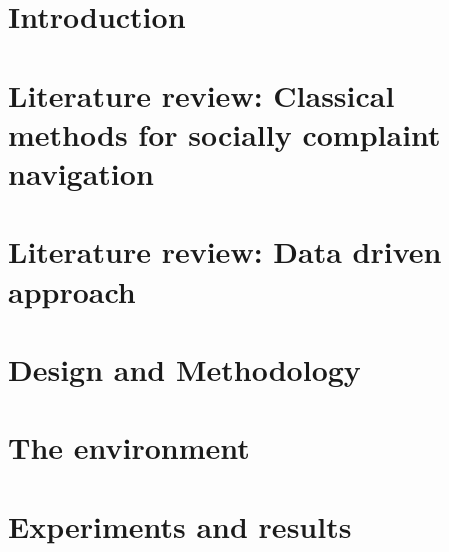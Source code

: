 \documentclass[letter,12pt,TexShade,oneside]{book}
\begin{document}
\pagestyle{fancyplain}




\onehalfspacing




%
%



\graphicspath{{img/}}



\chapter{Introduction}
\label{ch:intro}

\chapter{Literature review: Classical methods for socially complaint navigation}
\label{ch:Chapter2}

\chapter{Literature review: Data driven approach}
\label{ch:Chapter3}


\chapter{Design and Methodology}
\label{ch:Chapter4}


\chapter{The environment}
\label{ch:Chapter5}


\chapter{Experiments and results}
\label{ch:Chapter6}

\end{document}

